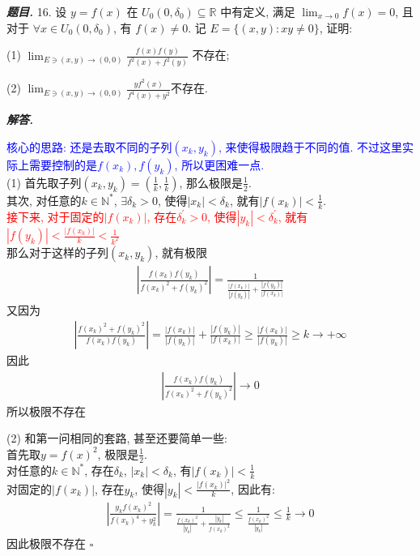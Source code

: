 \documentclass[10pt, a4paper, oneside]{ctexart}
\newenvironment{problem}{\begin{framed}\par\noindent\textbf{\textit{题目. }}}{\end{framed}\par}
\newenvironment{solution}{%
  \par\noindent\textbf{\textit{解答. }}\ignorespaces
}{%
  \hfill\ensuremath{\square}\par %
}
\begin{document}
\begin{problem}
16. 设 $y=f(x)$ 在 $U_0\left(0, \delta_0\right) \subseteq \mathbb{R}$ 中有定义, 满足 $\lim _{x \rightarrow 0} f(x)=0$, 且对于 $\forall x \in U_0\left(0, \delta_0\right)$, 有 $f(x) \neq 0$. 记 $E=\{(x, y): x y \neq 0\}$, 证明:

(1) $\lim _{E \ni(x, y) \rightarrow(0,0)} \frac{f(x) f(y)}{f^2(x)+f^2(y)}$ 不存在;

(2) $\lim_{E \ni(x, y) \rightarrow(0,0)}  \frac{yf^2(x)}{f^4(x)+y^2}$不存在.
\end{problem}

\begin{solution}
\textcolor{blue}{核心的思路: 还是去取不同的子列$(x_k,y_k)$, 来使得极限趋于不同的值. 不过这里实际上需要控制的是$f(x_k),f(y_k)$, 所以更困难一点.}\\
(1) 首先取子列$(x_k , y_k)=(\frac{1}{k}, \frac{1}{k})$, 那么极限是$\frac{1}{2}$.\\
其次, 对任意的$k\in \mathbb{N}^{*}$, $\exists \delta_k > 0$, 使得$|x_k|<\delta_k$, 就有$|f(x_k)|<\frac{1}{k}$.\\
\textcolor{red}{接下来, 对于固定的$|f(x_k)|$, 存在$\delta^{\prime}_k>0$, 使得$|y_k|<\delta^{\prime}_k$, 就有$|f(y_k)|<\frac{|f(x_k)|}{k}<\frac{1}{k^2}$}\\
那么对于这样的子列$(x_k,y_k)$, 就有极限
\begin{align*}
|\frac{f(x_k)f(y_k)}{f(x_k)^2+f(y_k)^2}| = \frac{1}{\frac{|f(x_k)|}{|f(y_k)|}+\frac{|f(y_k)|}{|f(x_k)|}}
\end{align*}
又因为
\begin{align*}
    |\frac{f(x_k)^2+f(y_k)^2}{f(x_k)f(y_k)}|= \frac{|f(x_k)|}{|f(y_k)|}+\frac{|f(y_k)|}{|f(x_k)|}\geq \frac{|f(x_k)|}{|f(y_k)|} \geq k \to +\infty
\end{align*}
因此
\begin{align*}
    |\frac{f(x_k)f(y_k)}{f(x_k)^2+f(y_k)^2}|\to 0
\end{align*}
所以极限不存在

(2) 和第一问相同的套路, 甚至还要简单一些:\\
首先取$y=f(x)^2$, 极限是$\frac{1}{2}$.\\
对任意的$k\in \mathbb{N}^*$, 存在$\delta_k$, $|x_k|<\delta_k$, 有$|f(x_k)|<\frac{1}{k}$\\
对固定的$|f(x_k)|$, 存在$y_k$, 使得$|y_k|<\frac{|f(x_k)|^2}{k}$, 因此有:
\begin{align*}
    |\frac{y_k f(x_k)^2}{f(x_k)^4+y_k^2 }|=\frac{1}{ \frac{f(x_k)^2}{|y_k|}+\frac{|y_k|}{f(x_k)^2}}\leq \frac{1}{ \frac{f(x_k)^2}{|y_k|}}\leq \frac{1}{k}\to 0
\end{align*}
因此极限不存在
\end{solution}
\end{document}
